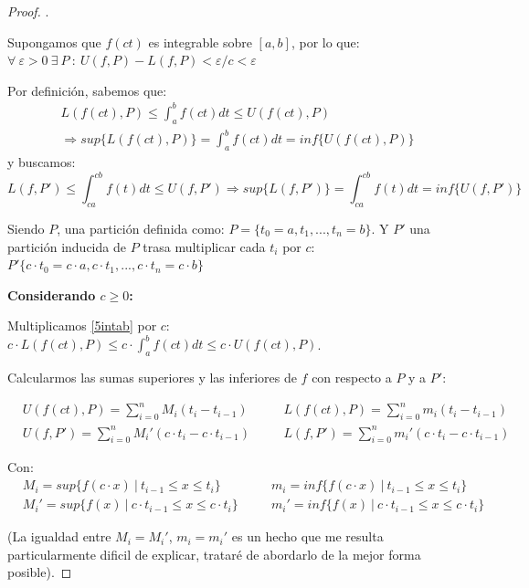 \documentclass[12pt]{article}
\begin{document}
\begin{proof}
    . \medskip

    Supongamos que \(f(ct)\) es integrable sobre \([a,b]\), por lo que: \(\forall \ \varepsilon>0 \ \exists \ P \ : \ U(f,P)-L(f,P)<\varepsilon/c<\varepsilon\)

    Por definici\'on, sabemos que:
    \begin{multline}
        \label{5intab}
        L(f(ct),P)\leq\int_{a}^{b}f(ct)dt\leq U(f(ct),P) \\ \Longrightarrow sup\{L(f(ct),P)\}=\int_{a}^{b}f(ct)dt=inf\{U(f(ct),P)\}
    \end{multline}
    y buscamos:
    \begin{equation}
        \label{5intcacb}
        L(f,P')\leq\int_{ca}^{cb}f(t)dt\leq U(f,P') \Longrightarrow sup\{L(f,P')\}=\int_{ca}^{cb}f(t)dt=inf\{U(f,P')\}
    \end{equation}

    Siendo $P$, una partici\'on definida como: \(P=\{t_0=a,t_1,...,t_n=b\}\). Y $P'$ una partici\'on inducida de $P$ trasa multiplicar cada $t_i$ por $c$: \(P'\{c\cdot t_0=c\cdot a,c\cdot t_1,...,c\cdot t_n=c\cdot b\}\)\bigskip

    \textbf{Considerando $c\geq0$:}\bigskip

    Multiplicamos \eqref{5intab} por $c$: \quad \(c\cdot L(f(ct),P)\leq c\cdot\int_{a}^{b}f(ct)dt\leq c\cdot U(f(ct),P)\).\bigskip

    Calcularmos las sumas superiores y las inferiores de $f$ con respecto a $P$ y a $P'$:

    \begin{align*}
        &U(f(ct),P)=\sum_{i=0}^n M_i(t_i-t_{i-1}) \quad &&L(f(ct),P)=\sum_{i=0}^n m_i(t_i-t_{i-1})\\
        &U(f,P')=\sum_{i=0}^n M_i'(c\cdot t_i-c\cdot t_{i-1}) \quad &&L(f,P')=\sum_{i=0}^n m_i'(c\cdot t_i-c\cdot t_{i-1})
    \end{align*}

    Con:
    \begin{align*}
        &M_i=sup\{f(c\cdot x) \ | \ t_{i-1}\leq x\leq t_i\} \quad &&m_i=inf\{f(c\cdot x) \ | \ t_{i-1}\leq x\leq t_i\}\\
        &M_i'=sup\{f(x) \ | \ c\cdot t_{i-1}\leq x\leq c\cdot t_i\} \quad &&m_i'=inf\{f(x) \ | \ c\cdot t_{i-1}\leq x\leq c\cdot t_i\}
    \end{align*}

    (La igualdad entre $M_i=M_i'$, $m_i=m_i'$ es un hecho que me resulta particularmente dificil de explicar, tratar\'e de abordarlo de la mejor forma posible).\bigskip


\end{proof}
\end{document}
